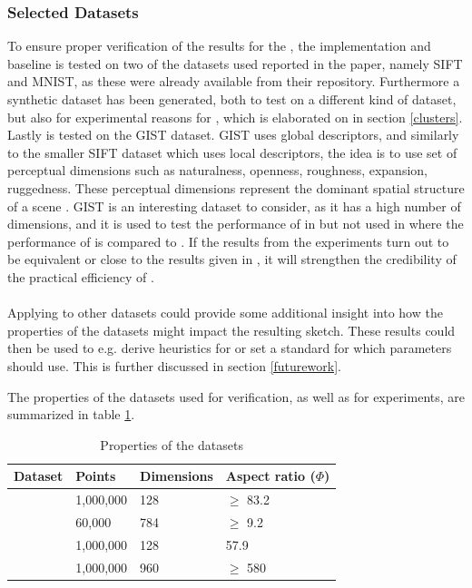 \subsubsection{Selected Datasets}
\label{datasets}
To ensure proper verification of the results for the \qs{}, the implementation and baseline is tested on two of the datasets used reported in the paper, namely SIFT and MNIST, as these were already available from their repository. Furthermore a synthetic dataset has been generated, both to test \qs{} on a different kind of dataset, but also for experimental reasons for \qsr{}, which is elaborated on in section \ref{clusters}. 
\\
Lastly \qs{} is tested on the GIST dataset. GIST uses global descriptors, and similarly to the smaller SIFT dataset which uses local descriptors, the idea is to use set of perceptual dimensions  such as naturalness, openness, roughness, expansion, ruggedness. These perceptual dimensions represent the dominant spatial structure of a scene \cite{MattD}. GIST is an interesting dataset to consider, as it has a high number of dimensions, and it is used to test the performance of \pq{} in \cite{schmid9} but not used in \cite{wagner17} where the performance of \qs{} is compared to \pq{}. If the results from the experiments turn out to be equivalent or close to the results given in \cite{wagner17}, it will strengthen the credibility of the practical efficiency of \qs{}. 
\\
\\
Applying \qs{} to other datasets could provide some additional insight into how the properties of the datasets might impact the resulting sketch. These results could then be used to e.g. derive heuristics for \qs{} or set a standard for which parameters \qs{} should use. This is further discussed in section \ref{futurework}.

The properties of the datasets used for verification, as well as for experiments, are summarized in table \ref{tab:datasets}.

\begin{table}[h]
	\centering
	\begin{tabular}{l l l l}
		\hline
		Dataset & Points & Dimensions & Aspect ratio ($\Phi$) \\
		\hline
		\sift{} & 1,000,000 & 128 & $\geq$ 83.2 \\
		\mnist{} & 60,000 & 784 & $\geq$ 9.2 \\
		\clust{} & 1,000,000 & 128 & 57.9 \\
		\gist{} & 1,000,000 & 960 & $\geq$ 580 \\
		\hline
	\end{tabular}
	\caption{Properties of the datasets}
	\label{tab:datasets}
\end{table}

